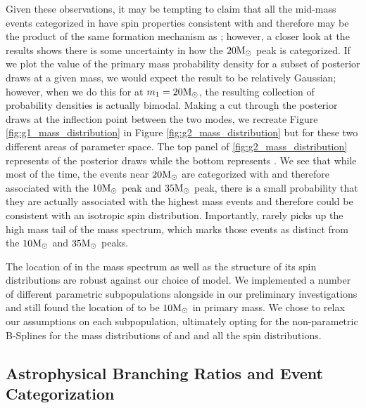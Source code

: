 Given these observations, it may be tempting to claim that all the mid-mass events categorized in \contA{} have spin properties consistent with \first{} and therefore may be the product of the same formation mechanism as \first{}; however, a closer look at the results shows there is some uncertainty in how the $20 {\rm M}_\odot$ peak is categorized. If we plot the value of the primary mass probability density for a subset of posterior draws at a given mass, we would expect the result to be relatively Gaussian; however, when we do this for \contB{} at $m_1 = 20 {\rm M}_\odot$, the resulting collection of probability densities is actually bimodal. Making a cut through the posterior draws at the inflection point between the two modes, we recreate Figure \ref{fig:g1_mass_distribution} in Figure \ref{fig:g2_mass_distribution} but for these two different areas of parameter space. The top panel of \ref{fig:g2_mass_distribution} represents  of the posterior draws while the bottom represents . We see that while most of the time, the events near $20{\rm M}_\odot$ are categorized with \contA{} and therefore associated with the $10{\rm M}_\odot$ peak and $35{\rm M}_\odot$ peak, there is a small probability that they are actually associated with the highest mass events and therefore could be consistent with an isotropic spin distribution. Importantly, \contA{} rarely picks up the high mass tail of the mass spectrum, which marks those events as distinct from the $10{\rm M}_\odot$ and $35{\rm M}_\odot$ peaks. 

The location of \first{} in the mass spectrum as well as the structure of its spin distributions are robust against our choice of model. We implemented a number of different parametric subpopulations alongside \first{} in our preliminary investigations and still found the location of \first{} to be $10{\rm M}_\odot$ in primary mass. We chose to relax our assumptions on each subpopulation, ultimately opting for the non-parametric B-Splines for the mass distributions of \contA{} and \contB{} and all the spin distributions.

\subsection{Astrophysical Branching Ratios and Event Categorization}

